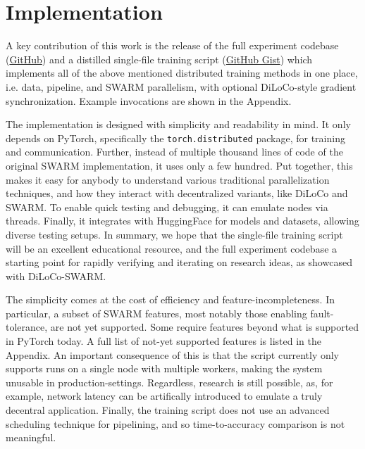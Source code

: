 \documentclass{article}
\newcommand{\github}{\href{https://github.com/mikasenghaas/swarm}{GitHub}}
\newcommand{\gist}{\href{https://gist.github.com/mikasenghaas/5fa1aa77ea69f187f531a5889983c249}{GitHub Gist}}
\begin{document}
\section{Implementation}


A key contribution of this work is the release of the full experiment codebase
(\github{}) and a distilled single-file training script (\gist{}) which
implements all of the above mentioned distributed training methods in one place,
i.e. data, pipeline, and SWARM parallelism, with optional DiLoCo-style gradient
synchronization. Example invocations are shown in the Appendix.

The implementation is designed with simplicity and readability in mind. It only
depends on PyTorch, specifically the \texttt{torch.distributed} package, for
training and communication. Further, instead of multiple thousand lines of code 
of the original SWARM implementation, it uses only a few hundred. Put together,
this makes it easy for anybody to understand various traditional parallelization
techniques, and how they interact with decentralized variants, like DiLoCo and
SWARM. To enable quick testing and debugging, it can emulate nodes via threads.
Finally, it integrates with HuggingFace for models and datasets, allowing
diverse testing setups. In summary, we hope that the single-file training script
will be an excellent educational resource, and the full experiment codebase a
starting point for rapidly verifying and iterating on research ideas, as
showcased with DiLoCo-SWARM.

The simplicity comes at the cost of efficiency and feature-incompleteness. In
particular, a subset of SWARM features, most notably those enabling
fault-tolerance, are not yet supported. Some require features beyond what is
supported in PyTorch today. A full list of not-yet supported features is listed
in the Appendix. An important consequence of this is that the script currently
only supports runs on a single node with multiple workers, making the system
unusable in production-settings. Regardless, research is still possible, as, for
example, network latency can be artifically introduced to emulate a truly
decentral application. Finally, the training script does not use an advanced
scheduling technique for pipelining, and so time-to-accuracy comparison is not
meaningful.
\end{document}
